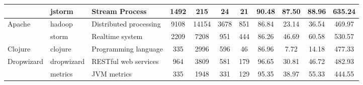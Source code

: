 \begin{table*}[]
{\begin{tabular}{lllcccccccc}
                            & jstorm                                                        & Stream Process                                                            & 1492           & 215             & 24                                                                    & 21             & 90.48          & 87.50          & 88.96          & 635.24                                               \\ \hline
\multirow{2}{*}{Apache}     & hadoop                                                        & Distributed processing                                                    & 9108           & 14154           & 3678                                                                  & 851            & 86.84          & 23.14          & 36.54          & 469.97                                               \\
                            & storm                                                         & Realtime system                                                           & 2209           & 7208            & 951                                                                   & 444            & 86.26          & 46.69          & 60.58          & 530.57                                               \\ \hline
Clojure                     & clojure                                                       & Programming language                                                      & 335            & 2996            & 596                                                                   & 46             & 86.96          & 7.72           & 14.18          & 477.33                                               \\ \hline
\multirow{2}{*}{Dropwizard} & dropwizard                                                    & RESTful web services                                                      & 964            & 3809            & 581                                                                   & 179            & 96.65          & 30.81          & 46.72          & 482.93                                               \\
                            & metrics                                                       & JVM metrics                                                               & 335            & 1948            & 331                                                                   & 129            & 95.35          & 38.97          & 55.33          & 444.55                                               \\ \hline

\end{tabular}}
\end{table*}
